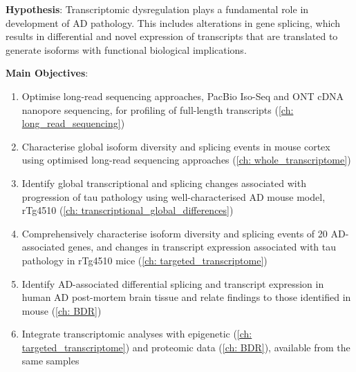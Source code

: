 
\textbf{Hypothesis}: Transcriptomic dysregulation plays a fundamental role in development of AD pathology. This includes alterations in gene splicing, which results in differential and novel expression of transcripts that are translated to generate isoforms with functional biological implications. 

\textbf{Main Objectives}:

\begin{enumerate}[]
	\item Optimise long-read sequencing approaches, PacBio Iso-Seq and ONT cDNA nanopore sequencing, for profiling of full-length transcripts (\cref{ch: long_read_sequencing}) 
	\item Characterise global isoform diversity and splicing events in mouse cortex using optimised long-read sequencing approaches (\cref{ch: whole_transcriptome}) 
	\item Identify global transcriptional and splicing changes associated with progression of tau pathology using well-characterised AD mouse model, rTg4510 (\cref{ch: transcriptional_global_differences})
	\item Comprehensively characterise isoform diversity and splicing events of 20 AD-associated genes, and changes in transcript expression associated with tau pathology in rTg4510 mice (\cref{ch: targeted_transcriptome})
	\item Identify AD-associated differential splicing and transcript expression in human AD post-mortem brain tissue and relate findings to those identified in mouse (\cref{ch: BDR})
	\item Integrate transcriptomic analyses with epigenetic (\cref{ch: targeted_transcriptome}) and proteomic data (\cref{ch: BDR}), available from the same samples
\end{enumerate}


